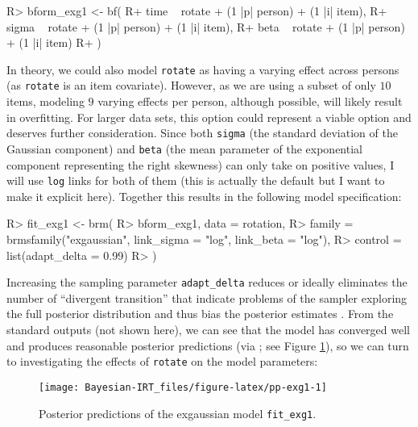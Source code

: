 \documentclass[
]{jss}
\begin{document}
\begin{CodeChunk}

\begin{CodeInput}
R> bform_exg1 <- bf(
R+   time ~ rotate + (1 |p| person) + (1 |i| item),
R+   sigma ~ rotate + (1 |p| person) + (1 |i| item),
R+   beta ~ rotate + (1 |p| person) + (1 |i| item)
R+ )
\end{CodeInput}
\end{CodeChunk}

In theory, we could also model \texttt{rotate} as having a varying
effect across persons (as \texttt{rotate} is an item covariate).
However, as we are using a subset of only \(10\) items, modeling \(9\)
varying effects per person, although possible, will likely result in
overfitting. For larger data sets, this option could represent a viable
option and deserves further consideration. Since both \texttt{sigma}
(the standard deviation of the Gaussian component) and \texttt{beta}
(the mean parameter of the exponential component representing the right
skewness) can only take on positive values, I will use \texttt{log}
links for both of them (this is actually the default but I want to make
it explicit here). Together this results in the following model
specification:

\begin{CodeChunk}

\begin{CodeInput}
R> fit_exg1 <- brm(
R>   bform_exg1, data = rotation,
R>   family = brmsfamily("exgaussian", link_sigma = "log", link_beta = "log"),
R>   control = list(adapt_delta = 0.99)
R> )
\end{CodeInput}
\end{CodeChunk}

Increasing the sampling parameter \texttt{adapt\_delta} reduces or
ideally eliminates the number of ``divergent transition'' that indicate
problems of the sampler exploring the full posterior distribution and
thus bias the posterior estimates \citep{carpenter2017, hoffman2014}.
From the standard outputs (not shown here), we can see that the model
has converged well and produces reasonable posterior predictions (via
; see Figure \ref{fig:pp-exg1}), so we can turn
to investigating the effects of \texttt{rotate} on the model parameters:

\begin{CodeChunk}
\begin{figure}

{\centering \texttt{[image: Bayesian-IRT\_files/figure-latex/pp-exg1-1]} 

}

\caption[Posterior predictions of the exgaussian model \texttt{fit\_exg1}]{Posterior predictions of the exgaussian model \texttt{fit\_exg1}.}\label{fig:pp-exg1}
\end{figure}
\end{CodeChunk}
\end{document}
